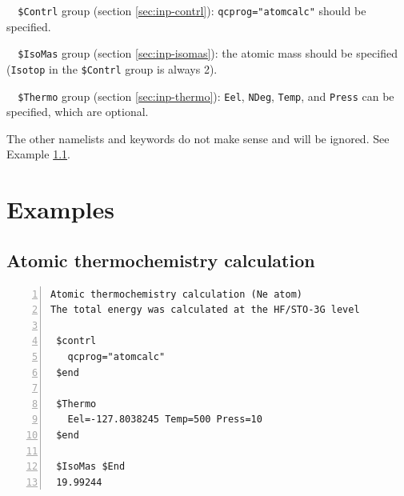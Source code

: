 \documentclass[12pt,english]{extarticle}
\begin{document}
\begin{description}
\item[ ]\verb|  $Contrl| group (section \ref{sec:inp-contrl}): \verb|qcprog="atomcalc"| should be specified.
\item[ ]\verb|  $IsoMas| group (section \ref{sec:inp-isomas}): the atomic mass should be specified (\verb|Isotop| in the \verb|$Contrl| group is always 2).
\item[ ]\verb|  $Thermo| group (section \ref{sec:inp-thermo}): \verb|Eel|, \verb|NDeg|, \verb|Temp|, and \verb|Press| can be specified, which are optional.
\end{description}
The other namelists and keywords do not make sense and will be ignored. See Example \ref{sec:exp1}.

\pagebreak{}


\section{Examples} \label{part:examp}

\subsection{Atomic thermochemistry calculation} \label{sec:exp1}

\begin{Verbatim}[frame=single,label=example,labelposition=topline,numbers=left,rulecolor=\color{green},fontsize=\footnotesize,baselinestretch=1.0]
Atomic thermochemistry calculation (Ne atom)
The total energy was calculated at the HF/STO-3G level

 $contrl
   qcprog="atomcalc"
 $end

 $Thermo
   Eel=-127.8038245 Temp=500 Press=10
 $end

 $IsoMas $End
 19.99244
\end{Verbatim}
\end{document}
